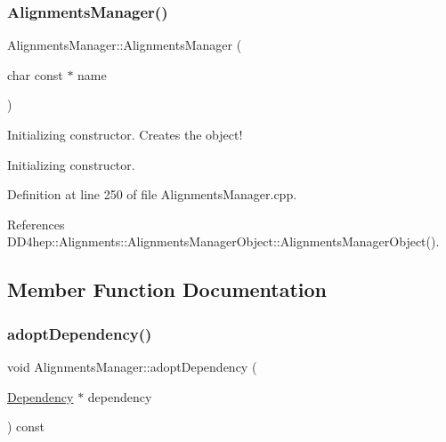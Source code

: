 \hypertarget{class_d_d4hep_1_1_alignments_1_1_alignments_manager_a7999f59e5ea1524757ff4ae11286d0b0}{}\label{class_d_d4hep_1_1_alignments_1_1_alignments_manager_a7999f59e5ea1524757ff4ae11286d0b0} 
\subsubsection{\texorpdfstring{Alignments\+Manager()}{AlignmentsManager()}\hspace{0.1cm}{\footnotesize\ttfamily [6/6]}}
{\footnotesize\ttfamily Alignments\+Manager\+::\+Alignments\+Manager (\begin{DoxyParamCaption}\item[{char const $\ast$}]{name }\end{DoxyParamCaption})}



Initializing constructor. Creates the object! 

Initializing constructor. 

Definition at line 250 of file Alignments\+Manager.\+cpp.



References D\+D4hep\+::\+Alignments\+::\+Alignments\+Manager\+Object\+::\+Alignments\+Manager\+Object().



\subsection{Member Function Documentation}
\hypertarget{class_d_d4hep_1_1_alignments_1_1_alignments_manager_a610c132f3f20bb3a24ff3e06eef0b901}{}\label{class_d_d4hep_1_1_alignments_1_1_alignments_manager_a610c132f3f20bb3a24ff3e06eef0b901} 
\subsubsection{\texorpdfstring{adopt\+Dependency()}{adoptDependency()}}
{\footnotesize\ttfamily void Alignments\+Manager\+::adopt\+Dependency (\begin{DoxyParamCaption}\item[{\hyperlink{class_d_d4hep_1_1_alignments_1_1_alignments_manager_a62dad65e1472f8939e5a83f859e96d26}{Dependency} $\ast$}]{dependency }\end{DoxyParamCaption}) const}



